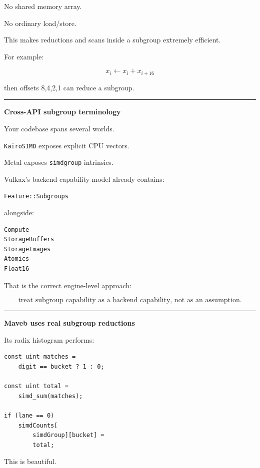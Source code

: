 No shared memory array.

No ordinary load/store.

This makes reductions and scans inside a subgroup extremely efficient.

For example:

\[
x_i
\leftarrow
x_i+x_{i+16}
\]

then offsets 8,4,2,1 can reduce a subgroup.

\begin{center}\rule{0.5\linewidth}{0.5pt}\end{center}

\textbf{Cross-API subgroup terminology}

Your codebase spans several worlds.

\texttt{KairoSIMD} exposes explicit CPU vectors.

Metal exposes \texttt{simdgroup} intrinsics.

Vulkax's backend capability model already contains:

\protect{}\label{1hu377}%
\begin{verbatim}
Feature::Subgroups
\end{verbatim}

alongside:

\protect{}\label{4aem6v}%
\begin{verbatim}
Compute
StorageBuffers
StorageImages
Atomics
Float16
\end{verbatim}

That is the correct engine-level approach:

\[
\boxed{
\text{treat subgroup capability as a backend capability, not as an assumption}.
}
\]

\begin{center}\rule{0.5\linewidth}{0.5pt}\end{center}

\textbf{Maveb uses real subgroup reductions}

Its radix histogram performs:

\protect{}\label{z1r98r}%
\begin{verbatim}
const uint matches =
    digit == bucket ? 1 : 0;

const uint total =
    simd_sum(matches);

if (lane == 0)
    simdCounts[
        simdGroup][bucket] =
        total;
\end{verbatim}

This is beautiful.

